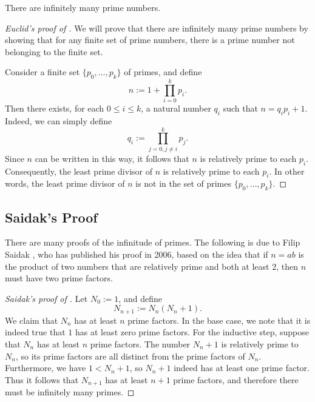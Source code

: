 \begin{theorem}\label{theorem:infinitude-of-primes}
  There are infinitely many prime numbers.
\end{theorem}

\begin{proof}[Euclid's proof of ]
  We will prove that there are infinitely many prime numbers by showing that for any finite set of prime numbers, there is a prime number not belonging to the finite set.
  
  Consider a finite set $\{p_0,\ldots,p_k\}$ of primes, and define
  \begin{equation*}
    n:= 1+\prod_{i=0}^k p_i.
  \end{equation*}
  Then there exists, for each $0\leq i\leq k$, a natural number $q_i$ such that $n=q_ip_i+1$. Indeed, we can simply define
  \begin{equation*}
    q_i := \prod_{j=0,j\neq i}^k p_j.
  \end{equation*}
  Since $n$ can be written in this way, it follows that $n$ is relatively prime to each $p_i$. Consequently, the least prime divisor of $n$ is relatively prime to each $p_i$. In other words, the least prime divisor of $n$ is not in the set of primes $\{p_0,\ldots,p_k\}$.
\end{proof}

\subsection{Saidak's Proof}

There are many proofs of the infinitude of primes. The following is due to Filip Saidak \cite{Saidak2006}, who has published his proof in 2006, based on the idea that if $n=ab$ is the product of two numbers that are relatively prime and both at least $2$, then $n$ must have two prime factors.

\begin{proof}[Saidak's proof of ]
  Let $N_0:= 1$, and define
  \begin{equation*}
    N_{n+1} := N_n(N_n + 1).
  \end{equation*}
  We claim that $N_n$ has at least $n$ prime factors. In the base case, we note that it is indeed true that $1$ has at least zero prime factors. For the inductive step, suppose that $N_n$ has at least $n$ prime factors. The number $N_n+1$ is relatively prime to $N_n$, so its prime factors are all distinct from the prime factors of $N_n$. Furthermore, we have $1<N_n+1$, so $N_n+1$ indeed has at least one prime factor. Thus it follows that $N_{n+1}$ has at least $n+1$ prime factors, and therefore there must be infinitely many primes.
\end{proof}

